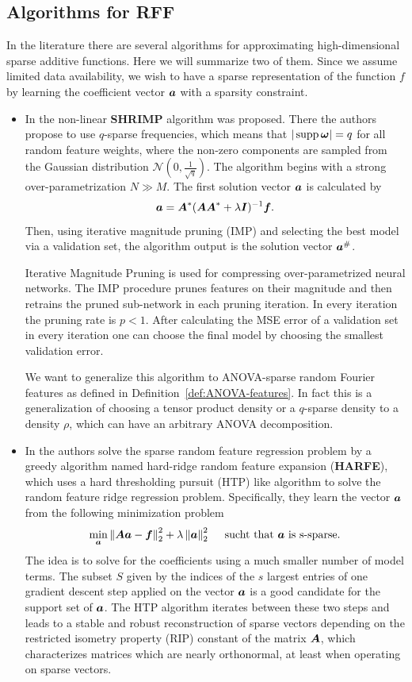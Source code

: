 \documentclass{article}
\renewcommand{\vec}[1]{\ensuremath \mathbf{\boldsymbol{#1}}}
\newcommand{\w}{\ensuremath{\vec \omega}}
\newcommand{\G}{\ensuremath{\mathcal{N}}} %
\DeclareMathOperator*{\supp}{supp}
\newcommand{\norm}[1]{\left\lVert {#1} \right\rVert}    %
\theoremstyle{definition}
\numberwithin{equation}{section}
\begin{document}
\subsection{Algorithms for RFF}\label{sec:RFFs}
In the literature there are several algorithms for approximating high-dimensional sparse additive
functions. Here we will summarize two of them. Since we assume limited data availability,
we wish to have a sparse representation of the function $f$ by learning the coefficient
vector $\vec a$ with a sparsity constraint.
\begin{itemize}
	\item In \cite{Xie22} the non-linear \textbf{SHRIMP} algorithm was proposed. There the authors propose to use $q$-sparse frequencies, which means that $|\supp \w| = q$ for all random feature weights, where the non-zero components are sampled from the Gaussian distribution $\G(0,\tfrac{ 1}{\sqrt q})$. The algorithm begins with a strong over-parametrization $N \gg M$. The first solution vector $\vec a$ is calculated by
$$\vec a = \vec A^* (\vec A\vec A^*+ \lambda \vec I)^{-1}\vec f.$$
Then, using iterative magnitude pruning (IMP) and selecting the best model via a validation set, the  algorithm output is the solution vector $\vec a^\#$.\par
Iterative Magnitude Pruning is used for compressing over-parametrized neural networks. The IMP procedure prunes features on their magnitude and then retrains the pruned sub-network in each pruning iteration. In every iteration the pruning rate is $p<1$. After calculating the MSE error of a validation set in every iteration one can choose the final model by choosing the smallest validation error.\par
We want to generalize this algorithm to ANOVA-sparse random Fourier features as defined in Definition~\ref{def:ANOVA-features}. In fact this is a generalization of choosing a tensor product density or a $q$-sparse density to a density $\rho$, which can have an arbitrary ANOVA decomposition. 

\item In \cite{HARFE23} the authors solve the sparse random feature regression problem by a
greedy algorithm named hard-ridge random feature expansion (\textbf{HARFE}), which uses
a hard thresholding pursuit (HTP) like algorithm to solve the random feature ridge
regression problem. Specifically, they learn the vector $\vec a$ from the following minimization problem
$$\min_{\vec a} \norm{\vec A\vec a -\vec f}_2^2 + \lambda \norm{\vec a}^2_2 \quad \text{ sucht that } \vec a \text{ is s-sparse}.$$
The idea is to solve for
the coefficients using a much smaller number of model terms. The subset $S$ given by
the indices of the $s$ largest entries of one gradient descent step applied on the vector $\vec a$
is a good candidate for the support set of $\vec a$. The HTP algorithm iterates between these
two steps and leads to a stable and robust reconstruction of sparse vectors depending
on the restricted isometry property (RIP) constant of the matrix $\vec A$, which characterizes matrices which are nearly orthonormal, at least when operating on sparse vectors. 

\end{itemize}
\end{document}
